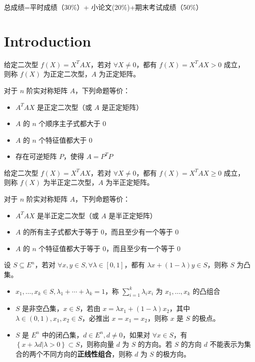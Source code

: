 

\newcommand\Title{最优化方法笔记}
\renewcommand\due{due: 16 weeks}
\newtheorem*{theorem}{定理}




总成绩=平时成绩（30\%）+ 小论文(20\%)+期末考试成绩（50\%）
\section{Introduction}
\begin{remark}
    给定二次型 $f(X) = X^T AX$，若对 $\forall X \neq 0$，都有 $f(X) = X^T AX > 0$ 成立，则称 $f(X)$ 为正定二次型，$A$ 为正定矩阵。

    对于 $n$ 阶实对称矩阵 $A$，下列命题等价：
    \begin{itemize}
        \item $A^T AX$ 是正定二次型（或 $A$ 是正定矩阵）
        \item $A$ 的 $n$ 个顺序主子式都大于 0
        \item $A$ 的 $n$ 个特征值都大于 0
        \item 存在可逆矩阵 $P$，使得 $A = P^T P$
    \end{itemize}
\end{remark}

\begin{remark}
    给定二次型 $f(X) = X^T AX$，若对 $\forall X \neq 0$，都有 $f(X) = X^T AX \ge 0$ 成立，则称 $f(X)$ 为半正定二次型，$A$ 为半正定矩阵。

    对于 $n$ 阶实对称矩阵 $A$，下列命题等价：
    \begin{itemize}
        \item $A^T AX$ 是半正定二次型（或 $A$ 是半正定矩阵）
        \item $A$ 的所有主子式都大于等于 0，而且至少有一个等于 0
        \item $A$ 的 $n$ 个特征值都大于等于 0，而且至少有一个等于 0
    \end{itemize}
\end{remark}

\begin{remark}
    设 $S \subseteq E^n$，若对 $\forall x, y \in S, \forall \lambda \in [0, 1]$，都有 $\lambda x + (1 - \lambda)y \in S$，则称 $S$ 为凸集。
    \begin{itemize}
        \item $x_1, \dots, x_k \in S, \lambda_1 + \cdots + \lambda_k = 1$，称 $\sum_{i = 1}^k \lambda_ix_i$ 为 $x_1, \dots, x_k$ 的凸组合
        \item $S$ 是非空凸集，$x\in S$，若由 $x = \lambda x_1 + (1 - \lambda)x_2$，其中 $\lambda \in (0, 1), x_1, x_2 \in S$，必推出 $x = x_1 = x_2$，则称 $x$ 是 $S$ 的极点。
        \item $S$ 是 $E^n$ 中的闭凸集，$d \in E^n, d \neq 0$，如果对 $\forall x \in S$，有 $\left\{x + \lambda d | \lambda > 0\right\} \subset S$，则称向量 $d$ 为 $S$ 的方向。若 $S$ 的方向 $d$ 不能表示为集合的两个不同方向的\textbf{正线性组合}，则称 $d$ 为 $S$ 的极方向。
    \end{itemize}
\end{remark}

